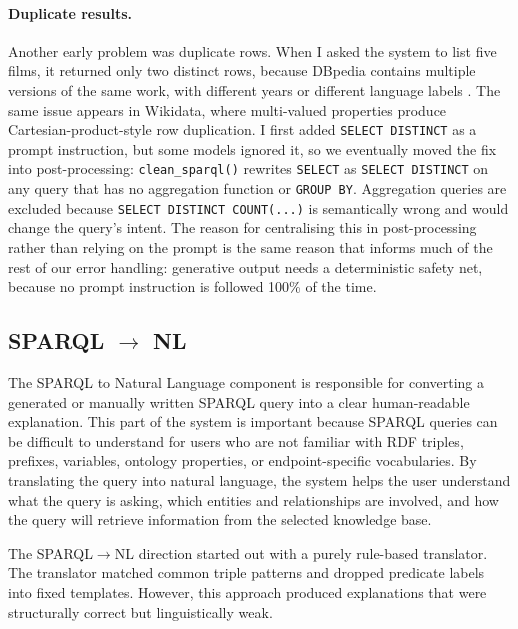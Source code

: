 \documentclass[11pt,a4paper]{article}
\begin{document}
\paragraph{Duplicate results.}
Another early problem was duplicate rows. When I asked the system to
list five films, it returned only two distinct rows, because DBpedia
contains multiple versions of the same work, with different years
or different language labels \cite{lehmann2015dbpedia}. The same
issue appears in Wikidata, where multi-valued properties produce
Cartesian-product-style row duplication. I first added
\texttt{SELECT DISTINCT} as a prompt instruction, but some models
ignored it, so we eventually moved the fix into post-processing:
\texttt{clean\_sparql()} rewrites \texttt{SELECT} as
\texttt{SELECT\,DISTINCT} on any query that has no aggregation
function or \texttt{GROUP\,BY}. Aggregation queries are excluded
because \texttt{SELECT\,DISTINCT\,COUNT(...)} is semantically wrong
and would change the query's intent. The reason for centralising
this in post-processing rather than relying on the prompt is the
same reason that informs much of the rest of our error handling:
generative output needs a deterministic safety net, because no
prompt instruction is followed 100\% of the time.








\subsection{SPARQL \texorpdfstring{$\rightarrow$}{->} NL}
\label{sec:sparql2nl}

The SPARQL to Natural Language component is responsible for converting a generated or manually written SPARQL query into a clear human-readable explanation. This part of the system is important because SPARQL queries can be difficult to understand for users who are not familiar with RDF triples, prefixes, variables, ontology properties, or endpoint-specific vocabularies.
By translating the query into natural language, the system helps the user understand what the query is asking, which entities and relationships are involved, and how the query will retrieve information from the selected knowledge base. 
 
The SPARQL$\rightarrow$NL direction started out with a purely rule-based translator. The translator matched common triple patterns and dropped predicate labels into fixed templates. However, this approach produced explanations that were structurally correct but linguistically weak. 
\end{document}
